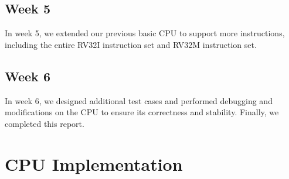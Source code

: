 \documentclass[11pt]{article}
\begin{document}
\subsection{Week 5}
In week 5, we extended our previous basic CPU to support more instructions, including the entire RV32I instruction set and RV32M instruction set.

\subsection{Week 6}
In week 6, we designed additional test cases and performed debugging and modifications on the CPU to ensure its correctness and stability. Finally, we completed this report.

\section{CPU Implementation}
\end{document}
